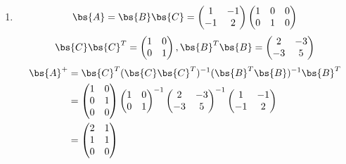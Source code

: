 \documentclass[12pt, a4paper, oneside, UTF8]{ctexbook}
\begin{document}
   
\begin{solution}
    \begin{enumerate}[label=(\arabic*)]
        \item \begin{align*}
            \bs{A}=\bs{B}\bs{C}=\begin{pmatrix}
                1&-1\\
                -1&2
            \end{pmatrix}\begin{pmatrix}
                1&0&0\\
                0&1&0
            \end{pmatrix}
        \end{align*}
        \begin{align*}
            \bs{C}\bs{C}^T=\begin{pmatrix}
                1&0\\
                0&1
            \end{pmatrix},\bs{B}^T\bs{B}=\begin{pmatrix}
                2&-3\\
                -3&5
            \end{pmatrix}
        \end{align*}
        \begin{align*}
            \bs{A}^+&=\bs{C}^T(\bs{C}\bs{C}^T)^{-1}(\bs{B}^T\bs{B})^{-1}\bs{B}^T\\
            &=\begin{pmatrix}
                1& 0\\
                0&1\\
                0&0
            \end{pmatrix}\begin{pmatrix}
                1&0\\
                0&1
            \end{pmatrix}^{-1}\begin{pmatrix}
                2&-3\\
                -3&5
            \end{pmatrix}^{-1}\begin{pmatrix}
                1&-1\\
                -1&2
            \end{pmatrix}\\
            &=\begin{pmatrix}
                2&1\\
                1&1\\
                0&0
            \end{pmatrix}
        \end{align*}
    

\end{enumerate}
\end{solution}
\end{document}
